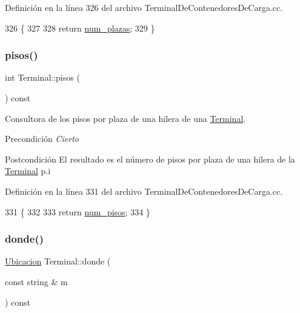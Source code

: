 Definición en la línea 326 del archivo Terminal\+De\+Contenedores\+De\+Carga.\+cc.


\begin{DoxyCode}
326                            \{
327     
328     \textcolor{keywordflow}{return} \hyperlink{class_terminal_a14265a71722ee28f3a50cee4a72e5607}{num\_plazas};
329 \}
\end{DoxyCode}
\mbox{\label{class_terminal_ae6e79d13bb240d038142256552ae0ec9}} 
\subsubsection{\texorpdfstring{pisos()}{pisos()}}
{\footnotesize\ttfamily int Terminal\+::pisos (\begin{DoxyParamCaption}{ }\end{DoxyParamCaption}) const}



Consultora de los pisos por plaza de una hilera de una \hyperlink{class_terminal}{Terminal}. 

\begin{DoxyPrecond}{Precondición}
{\itshape Cierto} 
\end{DoxyPrecond}
\begin{DoxyPostcond}{Postcondición}
El resultado es el número de pisos por plaza de una hilera de la \hyperlink{class_terminal}{Terminal} p.\+i 
\end{DoxyPostcond}


Definición en la línea 331 del archivo Terminal\+De\+Contenedores\+De\+Carga.\+cc.


\begin{DoxyCode}
331                           \{
332     
333     \textcolor{keywordflow}{return} \hyperlink{class_terminal_ad6cdee7fe26b4443d45b0a18c345a86d}{num\_pisos};
334 \}
\end{DoxyCode}
\mbox{\label{class_terminal_a2847cb58fe61bb488f089bc67a1973fe}} 
\subsubsection{\texorpdfstring{donde()}{donde()}}
{\footnotesize\ttfamily \hyperlink{class_ubicacion}{Ubicacion} Terminal\+::donde (\begin{DoxyParamCaption}\item[{const string \&}]{m }\end{DoxyParamCaption}) const}



